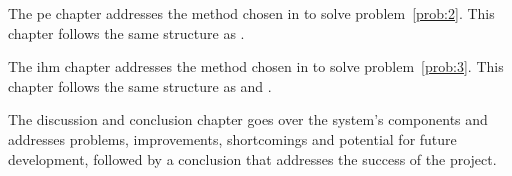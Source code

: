 \textbf{} The \gls{pe} chapter addresses the method chosen in  to solve problem~\ref{prob:2}. This chapter follows the same structure as . \medskip

\textbf{} The \gls{ihm} chapter addresses the method chosen in  to solve problem~\ref{prob:3}. This chapter follows the same structure as  and . \medskip

\textbf{} The discussion and conclusion chapter goes over the system's components and addresses problems, improvements, shortcomings and potential for future development, followed by a conclusion that addresses the success of the project.\medskip



